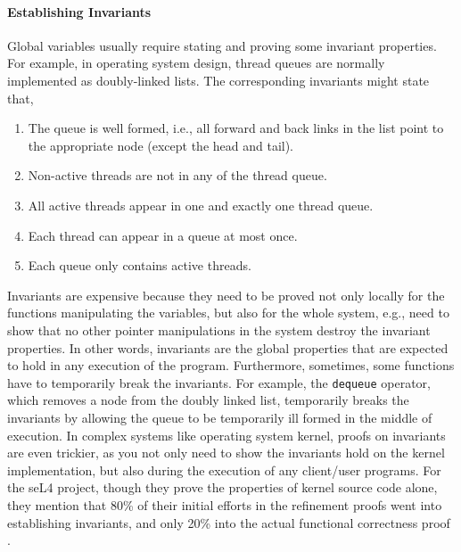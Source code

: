 {\paragraph{Establishing Invariants}
Global variables usually require stating and proving some invariant properties.
For example, in operating system design, thread queues are normally implemented
as doubly-linked lists. The corresponding invariants might state that,
\begin{invariant}
\begin{enumerate}
\item The queue is well formed, i.e., all forward and back links in the list
point to the appropriate node (except the head and tail).
\item Non-active threads are not in any of the thread queue.
\item All active threads appear in one and exactly one thread queue.
\item Each thread can appear in a queue at most once.
\item Each queue only contains active threads.
\end{enumerate}
\end{invariant}
Invariants are expensive because they need to be proved not only
locally for the functions manipulating the variables, but also for the whole system,
e.g., need to show that no other pointer manipulations in the system
destroy the invariant properties. 
In other words, invariants are the global properties that are expected to hold
in any execution of the program.
Furthermore, sometimes, some functions have
to temporarily break the invariants. For example, the \verb+dequeue+ operator,
which removes a node from the doubly linked list, temporarily breaks the invariants
by allowing the queue to be temporarily ill formed in the middle of execution.
In complex systems like operating system kernel, proofs on invariants are even
trickier, as you not only need to show the invariants hold on the kernel implementation,
but also during the execution of any client/user programs.
For the seL4 project, though they prove the properties of kernel source code alone,
they mention that 80\% of their initial efforts in the
refinement proofs went into establishing invariants, and only 20\% into the
actual functional correctness proof \cite{klein2009sel4}.

}
